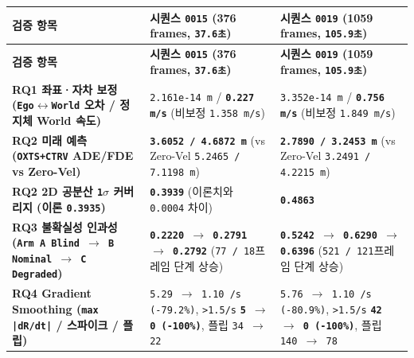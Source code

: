\documentclass[10.5pt,a4paper]{article}
\begin{document}
\begin{footnotesize}
\setlength{\tabcolsep}{4pt}
\setlength{\LTleft}{0pt}\setlength{\LTright}{0pt}
\begin{longtable}{>{\raggedright\arraybackslash}p{} >{\raggedright\arraybackslash}p{} >{\raggedright\arraybackslash}p{}}
\toprule
\textbf{검증 항목} & \textbf{시퀀스 \texttt{0015} (376 frames, \texttt{37.\allowbreak{}6초})} & \textbf{시퀀스 \texttt{0019} (1059 frames, \texttt{105.\allowbreak{}9초})} \\
\midrule
\endfirsthead
\toprule
\textbf{검증 항목} & \textbf{시퀀스 \texttt{0015} (376 frames, \texttt{37.\allowbreak{}6초})} & \textbf{시퀀스 \texttt{0019} (1059 frames, \texttt{105.\allowbreak{}9초})} \\
\midrule
\endhead
\bottomrule
\endfoot
\textbf{RQ1 좌표·자차 보정 (\texttt{Ego$\leftrightarrow$World} 오차 / 정지체 World 속도)} & \texttt{2.\allowbreak{}161e-\allowbreak{}14 m} / \textbf{\texttt{0.\allowbreak{}227 m/\allowbreak{}s}} (비보정 \texttt{1.\allowbreak{}358 m/\allowbreak{}s}) & \texttt{3.\allowbreak{}352e-\allowbreak{}14 m} / \textbf{\texttt{0.\allowbreak{}756 m/\allowbreak{}s}} (비보정 \texttt{1.\allowbreak{}849 m/\allowbreak{}s}) \\
\textbf{RQ2 미래 예측 (\texttt{OXTS+CTRV} ADE/FDE vs Zero-Vel)} & \textbf{\texttt{3.\allowbreak{}6052 /\allowbreak{} 4.\allowbreak{}6872 m}} (vs Zero-Vel \texttt{5.\allowbreak{}2465 /\allowbreak{} 7.\allowbreak{}1198 m}) & \textbf{\texttt{2.\allowbreak{}7890 /\allowbreak{} 3.\allowbreak{}2453 m}} (vs Zero-Vel \texttt{3.\allowbreak{}2491 /\allowbreak{} 4.\allowbreak{}2215 m}) \\
\textbf{RQ2 2D 공분산 \texttt{1$\sigma$} 커버리지 (이론 \texttt{0.\allowbreak{}3935})} & \textbf{\texttt{0.\allowbreak{}3939}} (이론치와 \texttt{0.\allowbreak{}0004} 차이) & \textbf{\texttt{0.\allowbreak{}4863}} \\
\textbf{RQ3 불확실성 인과성 (\texttt{Arm A Blind $\rightarrow$ B Nominal $\rightarrow$ C Degraded})} & \textbf{\texttt{0.\allowbreak{}2220 $\rightarrow$ 0.\allowbreak{}2791 $\rightarrow$ 0.\allowbreak{}2792}} (\texttt{77 /\allowbreak{} 18}프레임 단계 상승) & \textbf{\texttt{0.\allowbreak{}5242 $\rightarrow$ 0.\allowbreak{}6290 $\rightarrow$ 0.\allowbreak{}6396}} (\texttt{521 /\allowbreak{} 121}프레임 단계 상승) \\
\textbf{RQ4 Gradient Smoothing (\texttt{max |dR/\allowbreak{}dt|} / 스파이크 / 플립)} & \texttt{5.\allowbreak{}29 $\rightarrow$ 1.\allowbreak{}10 /\allowbreak{}s (-\allowbreak{}79.\allowbreak{}2\%)}, \texttt{>1.\allowbreak{}5/\allowbreak{}s} \textbf{\texttt{5 $\rightarrow$ 0 (-\allowbreak{}100\%)}}, 플립 \texttt{34 $\rightarrow$ 22} & \texttt{5.\allowbreak{}76 $\rightarrow$ 1.\allowbreak{}10 /\allowbreak{}s (-\allowbreak{}80.\allowbreak{}9\%)}, \texttt{>1.\allowbreak{}5/\allowbreak{}s} \textbf{\texttt{42 $\rightarrow$ 0 (-\allowbreak{}100\%)}}, 플립 \texttt{140 $\rightarrow$ 78} \\

\end{longtable}
\end{footnotesize}
\end{document}
